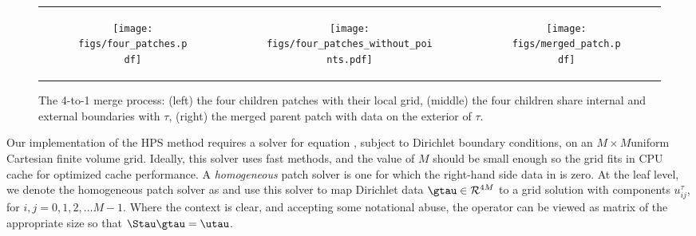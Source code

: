 \begin{figure}
    \centering
    \begin{tabular}{ccc}
        \begin{subfigure}[t]{0.3\textwidth}
            \centering
            \texttt{[image: figs/four\_patches.pdf]}
            \label{subfig:4_patches_with_grid}
        \end{subfigure}
        &
        \begin{subfigure}[t]{0.3\textwidth}
            \centering
            \texttt{[image: figs/four\_patches\_without\_points.pdf]}
            \label{subfig:4_patches}
        \end{subfigure}
        &
        \begin{subfigure}[t]{0.3\textwidth}
            \centering
            \texttt{[image: figs/merged\_patch.pdf]}
            \label{subfig:parent_patch}
        \end{subfigure}
    \end{tabular}
    \caption{The 4-to-1 merge process: (left) the four children patches with their local grid, (middle) the four children share internal and external boundaries with $\tau$, (right) the merged parent patch with data on the exterior of $\tau$.}
    \label{fig:4_to_1_patches}
\end{figure}
Our implementation of the HPS method requires a solver for equation , subject to Dirichlet boundary conditions, on an $M \times M$uniform Cartesian finite volume grid.   Ideally, this solver uses fast methods, and the value of $M$ should be small enough so the grid fits in CPU cache for optimized cache performance.  A {\em homogeneous} patch solver is one for which the right-hand side data in  is zero.  At the leaf level, we denote the homogeneous patch solver as \Stau and use this solver to map Dirichlet data $\gtau \in \mathcal R^{4M}$ to a grid solution \utau with components $u^\tau_{ij}$, for $i,j = 0,1,2,\hdots M-1$.  Where the context is clear, and accepting some notational abuse,  the operator \Stau can be viewed as matrix of the appropriate size so that $\Stau \gtau = \utau$.  


